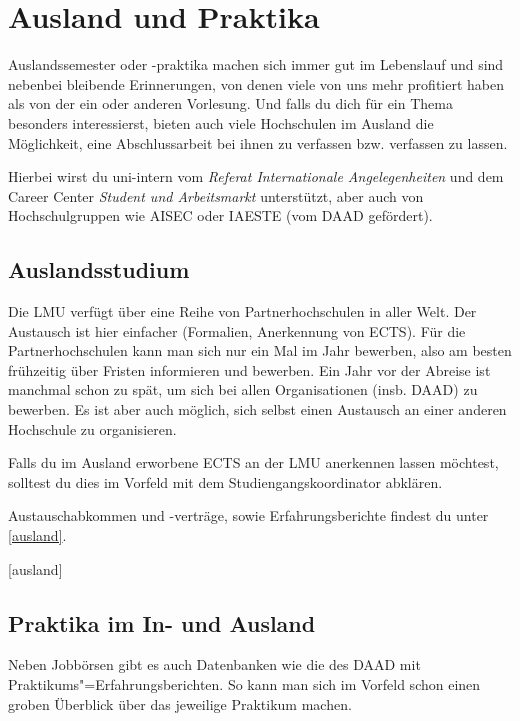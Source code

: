 ﻿\chapter{Ausland und Praktika}

Auslandssemester oder -praktika machen sich immer gut im Lebenslauf
und sind nebenbei bleibende Erinnerungen, von denen viele von uns mehr
profitiert haben als von der ein oder anderen Vorlesung. Und falls du
dich für ein Thema besonders interessierst, bieten auch viele
Hochschulen im Ausland die Möglichkeit, eine Abschlussarbeit bei ihnen
zu verfassen bzw. verfassen zu lassen.

Hierbei wirst du uni-intern vom \emph{Referat Internationale Angelegenheiten} und dem Career Center \emph{Student und Arbeitsmarkt} unterstützt, aber auch von Hochschulgruppen wie AISEC oder IAESTE (vom DAAD gefördert).

\section{Auslandsstudium}

Die LMU verfügt über eine Reihe von Partnerhochschulen in aller
Welt. Der Austausch ist hier einfacher (Formalien, Anerkennung von
ECTS). Für die
Partnerhochschulen kann man sich nur ein Mal im Jahr bewerben, also am
besten frühzeitig über Fristen informieren und bewerben.
Ein Jahr vor der Abreise ist manchmal schon zu spät, um sich bei
allen Organisationen (insb. DAAD) zu bewerben.
Es ist aber auch möglich, sich selbst einen Austausch an einer anderen
Hochschule zu organisieren.

Falls du im Ausland erworbene ECTS an der LMU anerkennen lassen
möchtest, solltest du dies im Vorfeld mit dem Studiengangskoordinator
abklären.

Austauschabkommen und -verträge, sowie Erfahrungsberichte findest du unter \ref{ausland}.

\begin{urlList}
	[ausland]
\end{urlList}

\section{Praktika im In- und Ausland}

Neben Jobbörsen gibt es auch Datenbanken wie die des DAAD mit
Praktikums"=Erfahrungsberichten. So kann man sich im Vorfeld schon
einen groben Überblick über das jeweilige Praktikum machen.

